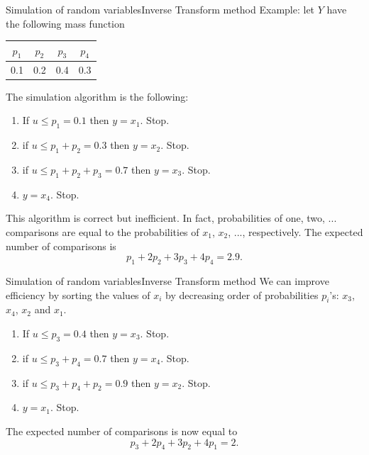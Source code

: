 \documentclass[handout]{beamer}
\begin{document}
\begin{frame}{Simulation of random variables}{Inverse Transform method}
Example: let $Y$ have the following mass function 
\begin{center}
\begin{tabular}{|c|c|c|c|}
\hline
$p_1$ & $p_2$ & $p_3$ & $p_4$\\ \hline
0.1 & 0.2 & 0.4 & 0.3 \\
\hline
\end{tabular}
\end{center}
The simulation algorithm is the following:
\begin{enumerate}
 \item If $u \leq p_1 = 0.1$ then $y=x_1$. Stop.
 \item if $u \leq p_1 + p_2 = 0.3$ then $y=x_2$. Stop.
 \item if $u \leq p_1 + p_2 + p_3 = 0.7$ then $y=x_3$. Stop.
 \item $y=x_4$. Stop.
\end{enumerate}
This algorithm is correct but inefficient. In fact, probabilities of one, two, ...
comparisons are equal to the probabilities of $x_1$, $x_2$, ..., respectively.
The expected number of comparisons is \[ p_1 + 2 p_2 + 3 p_3 + 4 p_4 = 2.9 .\]
\end{frame}

\begin{frame}{Simulation of random variables}{Inverse Transform method}
We can improve efficiency by sorting the values of $x_i$ by decreasing order 
of probabilities $p_i$'s: $x_3$, $x_4$, $x_2$ and $x_1$.
\begin{enumerate}
 \item If $u \leq p_3 = 0.4$ then $y=x_3$. Stop.
 \item if $u \leq p_3 + p_4 = 0.7$ then $y=x_4$. Stop.
 \item if $u \leq p_3 + p_4 + p_2 = 0.9$ then $y=x_2$. Stop.
 \item $y=x_1$. Stop.
\end{enumerate}
\vspace{1cm}
The expected number of comparisons is now equal to 
\[ p_3 + 2 p_4 + 3 p_2 + 4 p_1 = 2 .\]
\end{frame}
\end{document}
